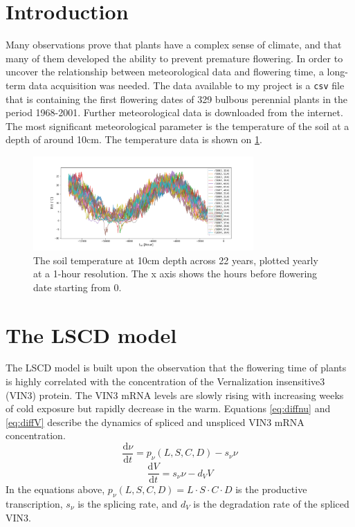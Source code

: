 \documentclass[11pt, a4paper]{article}
\begin{document}
\section*{Introduction}
\par Many observations prove that plants have a complex sense of climate, and that many of them developed the ability
to prevent premature flowering.
In order to uncover the relationship between meteorological data and flowering time, a long-term data acquisition was needed.
The data available to my project is a \texttt{csv} file that is containing the first flowering dates of 329 bulbous perennial plants 
in the period 1968-2001. Further meteorological data is downloaded from the internet. The most significant meteorological parameter 
is the temperature of the soil at a depth of around 10cm. The temperature data is shown on \ref{fig:tempdata}.
\begin{figure}[H]
    \centering
    \includegraphics[width=0.75\textwidth]{images/temp_plot.png}
    \caption{The soil temperature at 10cm depth across 22 years, plotted yearly at a 1-hour resolution.
    The x axis shows the hours before flowering date starting from 0.}
    \label{fig:tempdata}
\end{figure}

\section*{The LSCD model}
The LSCD model is built upon the observation that the flowering time of plants is highly correlated with the concentration 
of the Vernalization insensitive3 (VIN3) protein. The  VIN3 mRNA levels are slowly rising with increasing weeks of cold exposure
but rapidly decrease in the warm. Equations \ref{eq:diffnu} and \ref{eq:diffV} describe the 
dynamics of spliced and unspliced VIN3 mRNA concentration.
\begin{equation}
    \frac{\mathrm d\nu}{\mathrm d t} = p_{\nu}(L, S, C, D) - s_{\nu}\nu
    \label{eq:diffnu}
\end{equation}
\begin{equation}
    \frac{\mathrm dV}{\mathrm dt} = s_{\nu}\nu - d_VV
    \label{eq:diffV}
\end{equation}
In the equations above, 
$p_{\nu}(L, S, C, D)=L\cdot S\cdot C\cdot D$ is the productive transcription,
$s_{\nu}$ is the splicing rate, and $d_V$ is the degradation rate of the spliced VIN3.
\end{document}
